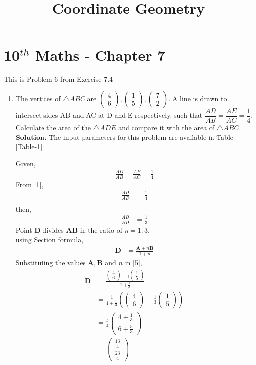 \documentclass[12pt]{article}
\providecommand{\brak}[1]{\ensuremath{\left(#1\right)}}
\newcommand{\solution}{\noindent \textbf{Solution: }}
\newcommand{\myvec}[1]{\ensuremath{\begin{pmatrix}#1\end{pmatrix}}}
\let\vec\mathbf
\begin{document}
\begin{center}
\title{\textbf{Coordinate Geometry}}
\date{\vspace{-5ex}} %
\maketitle
\end{center}
\setcounter{page}{1}
\section*{10$^{th}$ Maths - Chapter 7}
This is Problem-6 from Exercise 7.4
\begin{enumerate}
\item The vertices of $\triangle ABC$ are $\myvec{4 \\ 6}, \myvec{1\\5}, \myvec{7\\2}$. A line is drawn to intersect sides AB and AC at D and E respectively, such that $\dfrac{AD}{AB}=\dfrac{AE}{AC}=\dfrac{1}{4}$. Calculate the area of the $\triangle ADE$ and compare it with the area of $\triangle ABC$.\\
\solution The input parameters for this problem are available in Table \eqref{Table-1}
\begin{table}[ht!]\centering

\caption{}
\label{Table-1}	
\end{table}


Given,
\begin{align}
\frac{AD}{AB}=\frac{AE}{AC}=\frac{1}{4}\label{1}
\end{align}
From \eqref{1},
\begin{align}
\frac{AD}{AB} &=\frac{1}{4}\\
\end{align}
then,
\begin{align}
\frac{AD}{BD} &=\frac{1}{3}
\end{align}
Point $\vec{D}$ divides $\vec{A}\vec{B}$ in the ratio of $n = 1:3$.\\
using Section formula,
\begin{align}
\vec{D} &=\frac{\vec{A}+n\vec{B}}{1+n}\label{5}
\end{align}
Substituting the values $\vec{A},\vec{B}$ and $n$ in \eqref{5},
\begin{align}
\vec{D} &=\frac{{\myvec{4\\6}+\frac{1}{3}\myvec{1\\5}}}{1+\frac{1}{3}}\\
	&=\frac{1}{1+\frac{1}{3}}\brak{{\myvec{4\\6}+\frac{1}{3}\myvec{1\\5}}} \\
	&=\frac{3}{4}\myvec{4+\frac{1}{3}\\[2pt]6+\frac{5}{3}}\\
	&=\myvec{\frac{13}{4}\\[2pt] \frac{23}{4}}
\end{align}


\end{enumerate}
\end{document}
